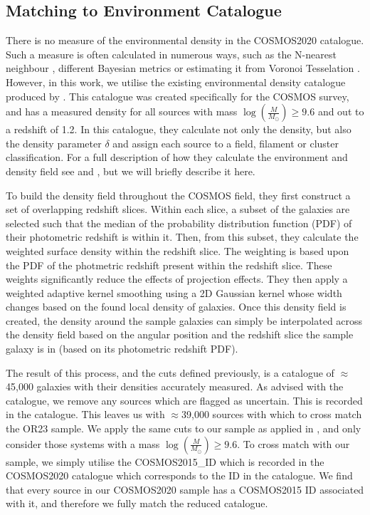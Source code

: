 \documentclass[fleqn,usenatbib]{mnras}
\begin{document}
\subsection{Matching to Environment Catalogue}\label{data:environ}
\noindent There is no measure of the environmental density in the COSMOS2020 catalogue. Such a measure is often calculated in numerous ways, such as the N-nearest neighbour \citep{2006MNRAS.373..469B}, different Bayesian metrics \citep{2008ApJ...674L..13C} or estimating it from Voronoi Tesselation \citep{2021inas.book...57V}. However, in this work, we utilise the existing environmental density catalogue produced by \citet{2017ApJ...837...16D}. This catalogue was created specifically for the COSMOS survey, and has a measured density for all sources with mass $\log(\frac{M}{M_\odot}) \geq 9.6$ and out to a redshift of 1.2. In this catalogue, they calculate not only the density, but also the density parameter $\delta$ and assign each source to a field, filament or cluster classification. For a full description of how they calculate the environment and density field see \citet{2015ApJ...805..121D} and \citet{2017ApJ...837...16D}, but we will briefly describe it here.

To build the density field throughout the COSMOS field, they first construct a set of overlapping redshift slices. Within each slice, a subset of the galaxies are selected such that the median of the probability distribution function (PDF) of their photometric redshift is within it. Then, from this subset, they calculate the weighted surface density within the redshift slice. The weighting is based upon the PDF of the photmetric redshift present within the redshift slice. These weights significantly reduce the effects of projection effects. They then apply a weighted adaptive kernel smoothing using a 2D Gaussian kernel whose width changes based on the found local density of galaxies. Once this density field is created, the density around the sample galaxies can simply be interpolated across the density field based on the angular position and the redshift slice the sample galaxy is in (based on its photometric redshift PDF).

The result of this process, and the cuts defined previously, is a catalogue of $\approx$45,000 galaxies with their densities accurately measured. As advised with the catalogue, we remove any sources which are flagged as uncertain. This is recorded in the catalogue. This leaves us with $\approx$39,000 sources with which to cross match the OR23 sample. We apply the same cuts to our sample as applied in \citet{2017ApJ...837...16D}, and only consider those systems with a mass $\log(\frac{M}{M_\odot}) \geq 9.6$. To cross match with our sample, we simply utilise the COSMOS2015\_ID which is recorded in the COSMOS2020 catalogue which corresponds to the ID in the \citet{2017ApJ...837...16D} catalogue. We find that every source in our COSMOS2020 sample has a COSMOS2015 ID associated with it, and therefore we fully match the reduced catalogue.
\end{document}
